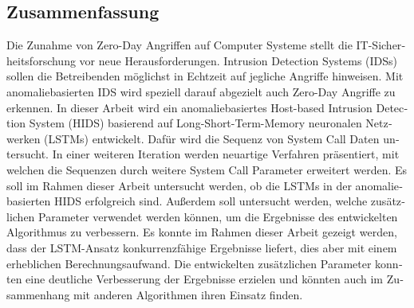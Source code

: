 \begin{otherlanguage}{ngerman}
\chapter*{Zusammenfassung}
Die Zunahme von Zero-Day Angriffen auf Computer Systeme stellt die IT-Sicherheitsforschung vor neue Herausforderungen.
Intrusion Detection Systems (IDSs) sollen die Betreibenden möglichst in Echtzeit auf jegliche Angriffe hinweisen.
Mit anomaliebasierten IDS wird speziell darauf abgezielt auch Zero-Day Angriffe zu erkennen.
In dieser Arbeit wird ein anomaliebasiertes Host-based Intrusion Detection System (HIDS) basierend auf Long-Short-Term-Memory neuronalen Netzwerken (LSTMs) entwickelt.
Dafür wird die Sequenz von System Call Daten untersucht.
In einer weiteren Iteration werden neuartige Verfahren präsentiert, mit welchen die Sequenzen durch weitere System Call Parameter erweitert werden.
Es soll im Rahmen dieser Arbeit untersucht werden, ob die LSTMs in der anomaliebasierten HIDS erfolgreich sind.
Außerdem soll untersucht werden, welche zusätzlichen Parameter verwendet werden können, um die Ergebnisse des entwickelten Algorithmus zu verbessern.
Es konnte im Rahmen dieser Arbeit gezeigt werden, dass der LSTM-Ansatz konkurrenzfähige Ergebnisse liefert, dies aber mit einem erheblichen Berechnungsaufwand.
Die entwickelten zusätzlichen Parameter konnten eine deutliche Verbesserung der Ergebnisse erzielen und könnten auch im Zusammenhang mit anderen Algorithmen ihren Einsatz finden.
\end{otherlanguage}

\endgroup

\vfill
